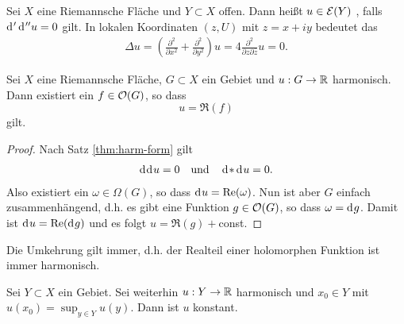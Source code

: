 \begin{defin}
  Sei $X$ eine Riemannsche Fläche und $Y \subset X$ offen. Dann heißt
  $u \in \mathcal{E}(Y)$ , falls $\d['\d[''u]] = 0$ gilt.
  In lokalen Koordinaten $(z,U)$ mit $z = x + iy$ bedeutet das
  \begin{align*}
    \Delta u = \left ( \frac{\partial^2}{\partial x^2} +
      \frac{\partial^2}{\partial y^2} \right ) u = 4
    \frac{\partial^2}{\partial z \partial \bar z} u = 0.
  \end{align*}
\end{defin}

\begin{prop}
  \label{prop:harm-realteil-hol}
  Sei $X$ eine Riemannsche Fläche, $G \subset X$ ein Gebiet
  und $u: G \rightarrow \mathbb{R}$ harmonisch. Dann existiert ein $f \in \mathcal{O}(G)$, so dass
  \[
  u = \Re(f)
  \]
  gilt.
\end{prop}

\begin{proof}
  Nach Satz \ref{thm:harm-form} gilt
  \begin{align*}
    \d[\d[u]] = 0 \quad \text{und} \quad \d[\ast\d[u]] = 0.
  \end{align*}
  Also existiert ein $\omega \in \Omega(G)$, so dass $\d[u] =
  \Re(\omega)$. Nun ist aber $G$ einfach zusammenhängend, d.h. es gibt
  eine Funktion $g \in \mathcal{O}(G)$, so dass $\omega = \d[g]$. Damit ist
  $\d[u] = \Re(\d[g])$ und es folgt $u = \Re(g) +$const.
\end{proof}

\begin{rem}
  Die Umkehrung gilt immer, d.h. der Realteil einer holomorphen
  Funktion ist immer harmonisch.
\end{rem}

\begin{prop}
  \label{prop:max-prinzip-harm}
  Sei $Y \subset X$ ein Gebiet. Sei weiterhin $u: Y \rightarrow \mathbb{R}$ harmonisch
  und $x_0 \in Y$ mit $u(x_0) = \sup_{y \in Y} u(y)$. Dann ist $u$ konstant.
\end{prop}

